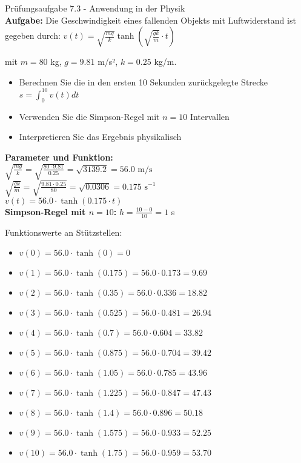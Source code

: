 \begin{example2}{Prüfungsaufgabe 7.3 - Anwendung in der Physik}\\
\textbf{Aufgabe:} Die Geschwindigkeit eines fallenden Objekts mit Luftwiderstand ist gegeben durch:
$v(t) = \sqrt{\frac{mg}{k}} \tanh\left(\sqrt{\frac{gk}{m}} \cdot t\right)$

mit $m = 80$ kg, $g = 9.81$ m/s², $k = 0.25$ kg/m.

\begin{itemize}
    \item Berechnen Sie die in den ersten 10 Sekunden zurückgelegte Strecke $s = \int_0^{10} v(t) dt$
    \item Verwenden Sie die Simpson-Regel mit $n = 10$ Intervallen
    \item Interpretieren Sie das Ergebnis physikalisch
\end{itemize}

\textbf{Parameter und Funktion:}
\vspace{1mm}\\
$\sqrt{\frac{mg}{k}} = \sqrt{\frac{80 \cdot 9.81}{0.25}} = \sqrt{3139.2} = 56.0 \text{ m/s}$\\
$\sqrt{\frac{gk}{m}} = \sqrt{\frac{9.81 \cdot 0.25}{80}} = \sqrt{0.0306} = 0.175 \text{ s}^{-1}$
\vspace{2mm}\\
$v(t) = 56.0 \cdot \tanh(0.175 \cdot t)$
\vspace{2mm}\\
\textbf{Simpson-Regel mit $n = 10$:}
$h = \frac{10 - 0}{10} = 1$ s

Funktionswerte an Stützstellen:
\begin{itemize}
    \item $v(0) = 56.0 \cdot \tanh(0) = 0$
    \item $v(1) = 56.0 \cdot \tanh(0.175) = 56.0 \cdot 0.173 = 9.69$
    \item $v(2) = 56.0 \cdot \tanh(0.35) = 56.0 \cdot 0.336 = 18.82$
    \item $v(3) = 56.0 \cdot \tanh(0.525) = 56.0 \cdot 0.481 = 26.94$
    \item $v(4) = 56.0 \cdot \tanh(0.7) = 56.0 \cdot 0.604 = 33.82$
    \item $v(5) = 56.0 \cdot \tanh(0.875) = 56.0 \cdot 0.704 = 39.42$
    \item $v(6) = 56.0 \cdot \tanh(1.05) = 56.0 \cdot 0.785 = 43.96$
    \item $v(7) = 56.0 \cdot \tanh(1.225) = 56.0 \cdot 0.847 = 47.43$
    \item $v(8) = 56.0 \cdot \tanh(1.4) = 56.0 \cdot 0.896 = 50.18$
    \item $v(9) = 56.0 \cdot \tanh(1.575) = 56.0 \cdot 0.933 = 52.25$
    \item $v(10) = 56.0 \cdot \tanh(1.75) = 56.0 \cdot 0.959 = 53.70$
\end{itemize}


\end{example2}

